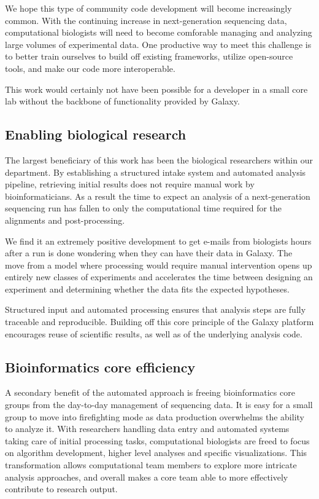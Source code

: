 \documentclass[10pt]{bmc_article}
\newenvironment{bmcformat}{\begin{raggedright}\baselineskip20pt\sloppy\setboolean{publ}{false}}{\end{raggedright}\baselineskip20pt\sloppy}
\begin{document}
\begin{bmcformat}
We hope this type of community code development will become
increasingly common. With the continuing increase in next-generation
sequencing data, computational biologists will need to become
comforable managing and analyzing large volumes of experimental
data. One productive way to meet this challenge is to better train
ourselves to build off existing frameworks, utilize open-source tools,
and make our code more interoperable.

This work would certainly not have been possible for a developer in a
small core lab without the backbone of functionality provided by Galaxy.

\subsection*{Enabling biological research}

The largest beneficiary of this work has been the biological
researchers within our department. By establishing a structured intake
system and automated analysis pipeline, retrieving initial results
does not require manual work by bioinformaticians. As a result
the time to expect an analysis of a next-generation sequencing run has
fallen to only the computational time required for the alignments and
post-processing.

We find it an extremely positive development to get e-mails from
biologists hours after a run is done wondering when they can have
their data in Galaxy. The move from a model where processing would
require manual intervention opens up entirely new classes of
experiments and accelerates the time between designing an experiment
and determining whether the data fits the expected hypotheses.

Structured input and automated processing ensures that analysis steps
are fully traceable and reproducible. Building off this core principle
of the Galaxy platform encourages reuse of scientific results, as well
as of the underlying analysis code.

\subsection*{Bioinformatics core efficiency}

A secondary benefit of the automated approach is freeing
bioinformatics core groups from the day-to-day management of
sequencing data. It is easy for a small group to move into
firefighting mode as data production overwhelms the ability to
analyze it. With researchers handling data entry and automated systems
taking care of initial processing tasks, computational biologists are
freed to focus on algorithm development, higher level analyses and
specific visualizations. This transformation allows computational team
members to explore more intricate analysis approaches, and overall
makes a core team able to more effectively contribute to research
output.


\end{bmcformat}
\end{document}
